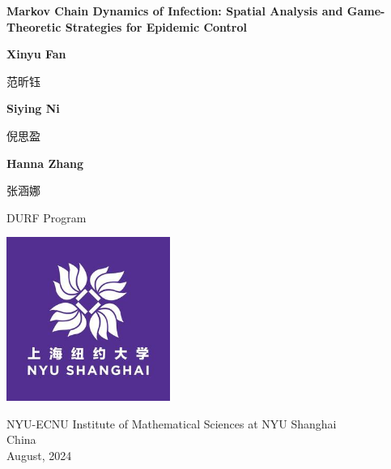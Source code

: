 \documentclass[11pt]{book}
\begin{document}
\begin{titlepage}
    \begin{center}
        \vspace*{1cm}
            
        \Huge
        \textbf{Markov Chain Dynamics of Infection: Spatial Analysis and Game-Theoretic
Strategies for Epidemic Control}
            
            
        \vspace{1.5cm}

 \textbf{Xinyu Fan}
\begin{CJK*}{UTF8}{gbsn}
范昕钰
\end{CJK*}
            
        \textbf{Siying Ni}
\begin{CJK*}{UTF8}{gbsn}
倪思盈
\end{CJK*}
        
        
 \textbf{Hanna Zhang}
\begin{CJK*}{UTF8}{gbsn}
张涵娜
\end{CJK*}


            
        \vfill
            
        DURF Program
            
        \vspace{0.8cm}
            
       \includegraphics[width=0.4\textwidth]{NYU_Shanghai_Logo.jpg}
            
        \Large
        NYU-ECNU Institute of Mathematical Sciences at NYU Shanghai\\
        China\\
        August, 2024
    \end{center}
\end{titlepage}
\end{document}
